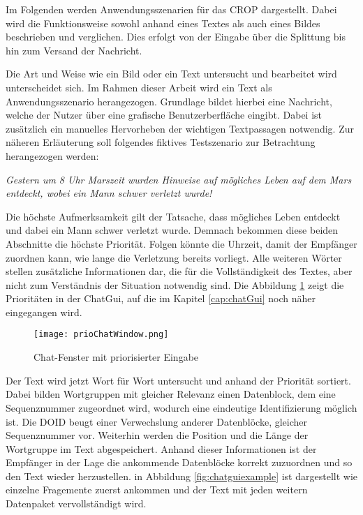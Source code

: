 \label{sec:Anwendungsszenarien}

Im Folgenden werden Anwendungsszenarien für das CROP dargestellt. Dabei wird die
Funktionsweise sowohl anhand eines Textes als auch eines Bildes beschrieben und
verglichen. Dies erfolgt von der Eingabe über die Splittung bis hin zum Versand
der Nachricht.

Die Art und Weise wie ein Bild oder ein Text untersucht und bearbeitet wird
unterscheidet sich. Im Rahmen dieser Arbeit wird ein Text als
Anwendungsszenario herangezogen. Grundlage bildet hierbei eine Nachricht,
welche der Nutzer über eine grafische Benutzerberfläche eingibt.
Dabei ist zusätzlich ein manuelles Hervorheben der wichtigen Textpassagen
notwendig. Zur näheren Erläuterung soll folgendes fiktives Testszenario zur
Betrachtung herangezogen werden:

\textit{\glqq Gestern um 8 Uhr Marszeit wurden Hinweise auf mögliches Leben auf
dem Mars entdeckt, wobei ein Mann schwer verletzt wurde! \grqq}

Die höchste Aufmerksamkeit gilt der Tatsache, dass mögliches Leben entdeckt und
dabei ein Mann schwer verletzt wurde. Demnach bekommen diese beiden Abschnitte
die höchste Priorität. Folgen könnte die Uhrzeit, damit der Empfänger zuordnen
kann, wie lange die Verletzung bereits vorliegt. Alle weiteren Wörter stellen
zusätzliche Informationen dar, die für die Vollständigkeit des Textes, aber
nicht zum Verständnis der Situation notwendig sind. Die Abbildung
\ref{fig:prioChatWindow} zeigt die Prioritäten in der ChatGui, auf die im
Kapitel \ref{cap:chatGui} noch näher eingegangen wird.
 

\begin{figure}[H]
	\centering
	\texttt{[image: prioChatWindow.png]}
	\label{fig:prioChatWindow}
	\caption{Chat-Fenster mit priorisierter Eingabe}
\end{figure}

Der Text wird jetzt Wort für Wort untersucht und anhand der Priorität sortiert.
Dabei bilden Wortgruppen mit gleicher Relevanz einen Datenblock, dem eine
Sequenznummer zugeordnet wird, wodurch eine eindeutige Identifizierung möglich
ist. Die DOID beugt einer Verwechslung anderer Datenblöcke, gleicher
Sequenznummer vor. Weiterhin werden die Position und die Länge der Wortgruppe im
Text abgespeichert. Anhand dieser Informationen ist der Empfänger in der Lage
die ankommende Datenblöcke korrekt zuzuordnen und so den Text wieder herzustellen.
in Abbildung \ref{fig:chatguiexample} ist dargestellt wie einzelne Fragemente
zuerst ankommen und der Text mit jeden weitern Datenpaket vervollständigt wird.

